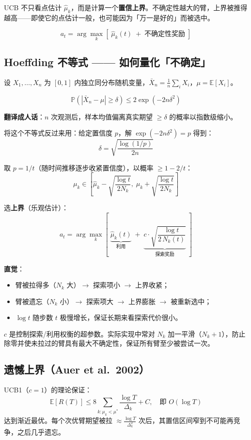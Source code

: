 \documentclass{article}
\begin{document}
UCB 不只看点估计 $\hat{\mu}_k$，而是计算一个\textbf{置信上界}。不确定性越大的臂，上界被推得越高——即使它的点估计一般，也可能因为「万一是好的」而被选中。

\[
\boxed{a_t = \arg\max_k \left[\; \hat{\mu}_k(t) \;+\; \text{不确定性奖励} \;\right]}
\]

\subsection*{Hoeffding 不等式 —— 如何量化「不确定」}

设 $X_1,\ldots,X_n$ 为 $[0,1]$ 内独立同分布随机变量，$\bar{X}_n = \frac{1}{n}\sum_i X_i$，$\mu = \mathbb{E}[X_i]$。

\[
\boxed{\mathbb{P}\left(|\bar{X}_n - \mu| \ge \delta\right) \le 2\exp\left(-2n\delta^2\right)}
\]

\textbf{翻译成人话}：$n$ 次观测后，样本均值偏离真实期望 $\ge \delta$ 的概率以指数级缩小。

将这个不等式反过来用：给定置信度 $p$，解 $\exp(-2n\delta^2)=p$ 得到：
\[
\delta = \sqrt{\frac{\log(1/p)}{2n}}
\]

取 $p = 1/t$（随时间推移逐步收紧置信度），以概率 $\ge 1-2/t$：
\[
\mu_k \in \left[\hat{\mu}_k - \sqrt{\frac{\log t}{2 N_k}},\; \hat{\mu}_k + \sqrt{\frac{\log t}{2 N_k}}\right]
\]

选\textbf{上界}（乐观估计）：
\[
\boxed{a_t = \arg\max_k \left[\; \underbrace{\hat{\mu}_k(t)}_{\text{利用}} \;+\; \underbrace{c \cdot \sqrt{\frac{\log t}{2\,N_k(t)}}}_{\text{探索奖励}} \;\right]}
\]

\textbf{直觉}：
\begin{itemize}
  \item 臂被拉得多（$N_k$ 大）$\to$ 探索项小 $\to$ 上界收紧；
  \item 臂被遗忘（$N_k$ 小）$\to$ 探索项大 $\to$ 上界膨胀 $\to$ 被重新选中；
  \item $\log t$ 随步数 $t$ 极慢增长，保证长期来看探索代价很小。
\end{itemize}

$c$ 是控制探索/利用权衡的超参数。实际实现中常对 $N_k$ 加一平滑（$N_k+1$），防止除零并使未拉过的臂具有最大不确定性，保证所有臂至少被尝试一次。

\subsection*{遗憾上界（Auer et al.\ 2002）}

UCB1（$c=1$）的理论保证：
\[
\mathbb{E}[R(T)] \le 8\sum_{k: \mu_k < \mu^*} \frac{\log T}{\Delta_k} + C, \quad \text{即 } O(\log T)
\]
达到渐近最优。每个次优臂期望被拉 $\approx \frac{\log T}{\Delta_k^2}$ 次后，其置信区间窄到不可能再竞争，之后几乎遗忘。
\end{document}
